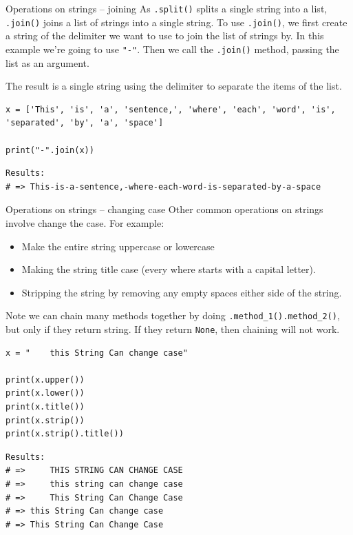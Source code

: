 \documentclass[10pt]{beamer}
\begin{document}
\begin{frame}[label={sec:org5274ee9},fragile]{Operations on strings -- joining}
 As \texttt{.split()} splits a single string into a list, \texttt{.join()} joins a list of strings into
a single string. To use \texttt{.join()}, we first create a string of the delimiter we want to
use to join the list of strings by. In this example we're going to use \texttt{"-"}. Then we
call the \texttt{.join()} method, passing the list as an argument.

The result is a single string using the delimiter to separate the items of the list.

\begin{verbatim}
x = ['This', 'is', 'a', 'sentence,', 'where', 'each', 'word', 'is', 'separated', 'by', 'a', 'space']

print("-".join(x))
\end{verbatim}

\begin{verbatim}
Results: 
# => This-is-a-sentence,-where-each-word-is-separated-by-a-space
\end{verbatim}
\end{frame}

\begin{frame}[label={sec:orgffda1b1},fragile]{Operations on strings -- changing case}
 Other common operations on strings involve change the case. For example:

\begin{itemize}
\item Make the entire string uppercase or lowercase
\item Making the string title case (every where starts with a capital letter).
\item Stripping the string by removing any empty spaces either side of the string.
\end{itemize}

\alert{Note} we can chain many methods together by doing \texttt{.method\_1().method\_2()}, but only if they
return string. If they return \texttt{None}, then chaining will not work.

\begin{verbatim}
x = "    this String Can change case"

print(x.upper())
print(x.lower())
print(x.title())
print(x.strip())
print(x.strip().title())
\end{verbatim}

\begin{verbatim}
Results: 
# =>     THIS STRING CAN CHANGE CASE
# =>     this string can change case
# =>     This String Can Change Case
# => this String Can change case
# => This String Can Change Case
\end{verbatim}
\end{frame}
\end{document}
